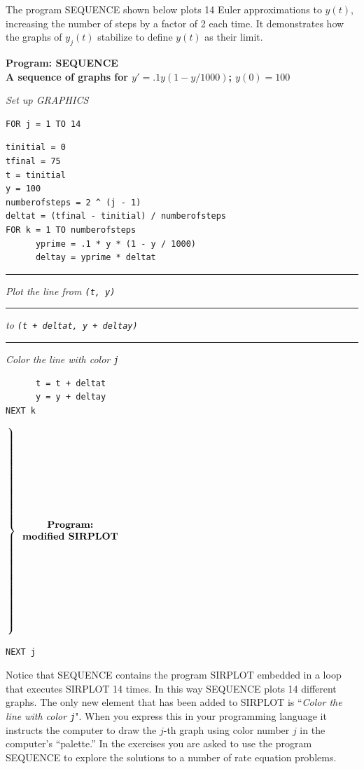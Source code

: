 The program SEQUENCE shown below plots 14 Euler approximations to
$y(t)$, increasing the number of steps by a factor of 2 each time.  It
demonstrates how the graphs of $y_j(t)$ stabilize to define $y(t)$ as
their limit.


\begin{center}

{\bf Program: SEQUENCE \\ [2pt]
A sequence of graphs for \boldmath $y' = .1y(1-y/1000)$; $y(0) = 100$}
\end{center}


{\sl Set up GRAPHICS}


\begin{verbatim}
FOR j = 1 TO 14
\end{verbatim}


\begin{verbatim}
tinitial = 0
tfinal = 75
t = tinitial
y = 100
numberofsteps = 2 ^ (j - 1)
deltat = (tfinal - tinitial) / numberofsteps
FOR k = 1 TO numberofsteps
      yprime = .1 * y * (1 - y / 1000)
      deltay = yprime * deltat
\end{verbatim}


\rule{33pt}{0pt} {\sl Plot the line from 
		{\tt (t, y)}}\\[-1pt]
\rule{54pt}{0pt} {\sl to 
		{\tt (t + deltat, y + deltay)}}\\
\rule{33pt}{0pt} {\sl Color the line with color {\tt j}}


\begin{verbatim}
      t = t + deltat
      y = y + deltay
NEXT k
\end{verbatim}

\mbox{}


$
\left.
\rule{0pt}{108pt}
\right\} 
	\begin{array}{c} 
		\mbox{\bf Program:} \\ 
		\mbox{\bf modified SIRPLOT} 
	\end{array}
$


\begin{verbatim}
NEXT j
\end{verbatim}

Notice that SEQUENCE contains the program SIRPLOT embedded in a loop
that executes SIRPLOT 14 times.  In this way SEQUENCE plots 14
different graphs.  The only new element that has been added to SIRPLOT
is ``{\sl Color the line with color {\tt j}}".  When you express this
in your programming language it instructs the computer to draw the
$j$-th graph using color number $j$ in the computer's ``palette.''  In
the exercises you are asked to use the program SEQUENCE to explore the
solutions to a number of rate equation problems.



